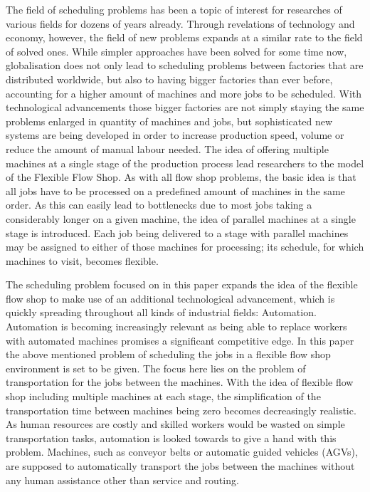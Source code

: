 The field of scheduling problems has been a topic of interest for researches of various fields for dozens of years already. Through
revelations of technology and economy, however, the field of new problems expands at a similar rate to the field of solved ones. While simpler
approaches have been solved for some time now, globalisation does not only lead to scheduling problems between factories 
that are distributed worldwide, but also to having bigger factories than ever before, accounting for a higher amount of machines and more jobs
to be scheduled. With technological advancements those bigger factories are not simply staying the same problems enlarged in
quantity of machines and jobs, but sophisticated new systems are being developed in order to increase production speed, volume or reduce
the amount of manual labour needed. The idea of offering multiple machines at a single stage of the production process lead researchers to the
model of the Flexible Flow Shop. As with all flow shop problems, the basic idea is that all jobs have to be processed on a predefined amount of machines in
the same order. As this can easily lead to bottlenecks due to most jobs taking a considerably longer on a given machine, the idea
of parallel machines at a single stage is introduced. Each job being delivered to a stage with parallel machines may be assigned to either of
those machines for processing; its schedule, for which machines to visit, becomes flexible. 

The scheduling problem focused on in this paper expands
the idea of the flexible flow shop to make use of an additional technological advancement, which is quickly spreading throughout all kinds of
industrial fields: Automation. Automation is becoming increasingly relevant as being able to replace workers with automated machines promises a
significant competitive edge. In this paper the above mentioned problem of scheduling the jobs in a flexible flow shop environment is set to be
given. The focus here lies on the problem of transportation for the jobs between the machines. With the idea of flexible flow shop including multiple
machines at each stage, the simplification of the transportation time between machines being zero becomes decreasingly realistic. As human resources
are costly and skilled workers would be wasted on simple transportation tasks, automation is looked towards to give a hand with this problem.
Machines, such as conveyor belts or automatic guided vehicles (AGVs), are supposed to automatically transport the jobs between the machines without
any human assistance other than service and routing. 

